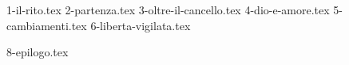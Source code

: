 \documentclass[a4paper,oneside,11pt]{memoir}
\begin{document}

    {1-il-rito.tex}
    {2-partenza.tex}
    {3-oltre-il-cancello.tex}
    {4-dio-e-amore.tex}
    {5-cambiamenti.tex}
    {6-liberta-vigilata.tex}

    \backmatter

    {8-epilogo.tex}
\end{document}
